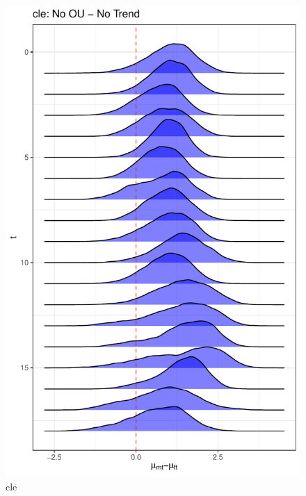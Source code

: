 \documentclass[
  12pt,
]{article}
\begin{document}
\begin{figure}

{\centering \includegraphics[width=0.9\linewidth]{../Figures/cle/mu_diff} 

}

\caption{cle}\label{fig:unnamed-chunk-7}
\end{figure}
\end{document}
